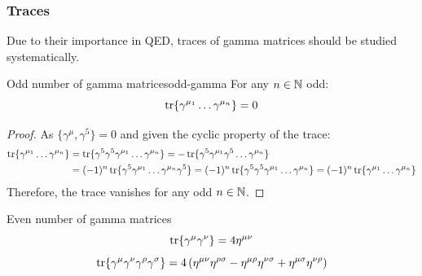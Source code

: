 \subsubsection{Traces}

Due to their importance in QED, traces of gamma matrices should be studied systematically.

\begin{proposition}{Odd number of gamma matrices}{odd-gamma}
  For any $ n \in \mathbb{N} $ odd:
  \begin{equation}
    \operatorname{tr}\{\gamma^{\mu_1} \dots \gamma^{\mu_n}\} = 0
  \end{equation}
\end{proposition}

\begin{proofbox}
  \begin{proof}
    As $ \{\gamma^\mu , \gamma^5\} = 0 $ and given the cyclic property of the trace:
    \begin{equation*}
      \begin{split}
        \operatorname{tr}\{\gamma^{\mu_1} \dots \gamma^{\mu_n}\}
        & = \operatorname{tr}\{\gamma^5 \gamma^5 \gamma^{\mu_1} \dots \gamma^{\mu_n}\} = - \operatorname{tr}\{\gamma^5 \gamma^{\mu_1} \gamma^5 \dots \gamma^{\mu_n}\} \\
        & = (-1)^n \operatorname{tr}\{\gamma^5 \gamma^{\mu_1} \dots \gamma^{\mu_n} \gamma^5\} = (-1)^n \operatorname{tr}\{\gamma^5 \gamma^5 \gamma^{\mu_1} \dots \gamma^{\mu_n}\} = (-1)^n \operatorname{tr}\{\gamma^{\mu_1} \dots \gamma^{\mu_n}\}
      \end{split}
    \end{equation*}
    Therefore, the trace vanishes for any odd $ n \in \mathbb{N} $.
  \end{proof}
\end{proofbox}

\begin{proposition}[before upper = {\tcbtitle}]{Even number of gamma matrices}{}
  \begin{equation}
    \operatorname{tr}\{\gamma^\mu \gamma^\nu\} = 4 \eta^{\mu \nu}
  \end{equation}
  \begin{equation}
    \operatorname{tr}\{\gamma^\mu \gamma^\nu \gamma^\rho \gamma^\sigma\} = 4 \left( \eta^{\mu \nu} \eta^{\rho \sigma} - \eta^{\mu \rho} \eta^{\nu \sigma} + \eta^{\mu \sigma} \eta^{\nu \rho} \right)
  \end{equation}
\end{proposition}

